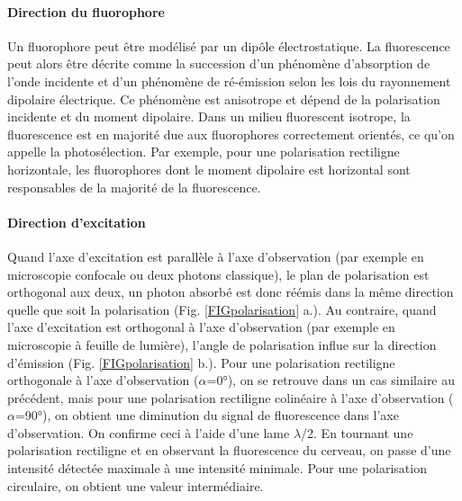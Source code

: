 \paragraph{Direction du fluorophore}

Un fluorophore peut être modélisé par un dipôle électrostatique. La fluorescence peut alors être décrite comme la succession d'un phénomène d'absorption de l'onde incidente et d'un phénomène de ré-émission selon les lois du rayonnement dipolaire électrique. Ce phénomène est anisotrope et dépend de la polarisation incidente et du moment dipolaire. Dans un milieu fluorescent isotrope, la fluorescence est en majorité due aux fluorophores correctement orientés, ce qu'on appelle la photosélection. Par exemple, pour une polarisation rectiligne horizontale, les fluorophores dont le moment dipolaire est horizontal sont responsables de la majorité de la fluorescence.


\paragraph{Direction d'excitation}

Quand l'axe d'excitation est parallèle à l'axe d'observation (par exemple en microscopie confocale ou deux photons classique), le plan de polarisation est orthogonal aux deux, un photon absorbé est donc réémis dans la même direction quelle que soit la polarisation (Fig. \ref{FIGpolarisation} a.). Au contraire, quand l'axe d'excitation est orthogonal à l'axe d'observation (par exemple en microscopie à feuille de lumière), l'angle de polarisation influe sur la direction d'émission (Fig. \ref{FIGpolarisation} b.). Pour une polarisation rectiligne orthogonale à l'axe d'observation ($\alpha$=0°), on se retrouve dans un cas similaire au précédent, mais pour une polarisation rectiligne colinéaire à l'axe d'observation ($\alpha$=90°), on obtient une diminution du signal de fluorescence dans l'axe d'observation.
On confirme ceci à l'aide d'une lame $\lambda$/2. En tournant une polarisation rectiligne et en observant la fluorescence du cerveau, on passe d'une intensité détectée maximale à une intensité minimale. Pour une polarisation circulaire, on obtient une valeur intermédiaire.





